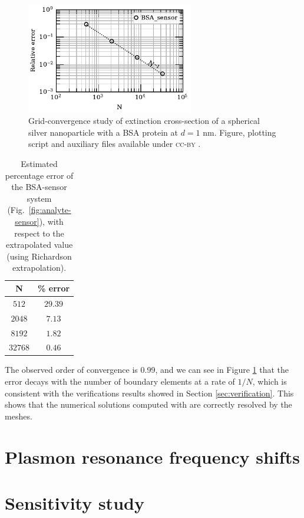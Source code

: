 \begin{figure}%
    \centering
    \includegraphics[width=0.65\textwidth]{convergence_bsa_sensor_R8_d1_w380.pdf} 
    \caption{Grid-convergence study of extinction cross-section of a spherical silver
             nanoparticle with a BSA protein at $d=1$ nm. 
             Figure, plotting script and auxiliary files available 
             under \textsc{cc-by} \cite{ClementiETal2018c}.}
    \label{fig:err_sph-bsa}
 \end{figure}

 \begin{table}%
    \centering
    \caption{\label{table:err_sph-bsa} Estimated percentage error of the BSA-sensor 
    system (Fig.~\ref{fig:analyte-sensor}), with respect to the extrapolated value 
    (using Richardson extrapolation).} 
    \begin{tabular}{c c}
    \hline%
    N & \% error \\
    \hline%
     $512$ & $29.39$ \\
     $2048$ & $7.13$ \\
     $8192$ & $1.82$ \\
     $32768$ & $0.46$ \\
    \hline%
    \end{tabular}
\end{table}

The observed order of convergence is 0.99, and we can see in Figure
 \ref{fig:err_sph-bsa} that the error decays with the number of boundary elements
 at a rate of $1/N$, which is consistent with the verifications results showed
 in Section \ref{sec:verification}. This shows that the numerical solutions computed
 with \pygbe are correctly resolved by the meshes.

\section{Plasmon resonance frequency shifts} \label{sec:shift_bsa}

\section{Sensitivity study} \label{sec:sensitivity}
